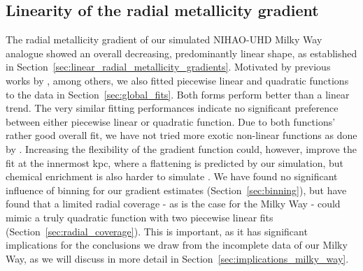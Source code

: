 \documentclass[twocolumn,apj,numberedappendix,appendixfloats]{openjournal}
\begin{document}
\begin{CJK*}{UTF8}{gbsn}
\subsection{Linearity of the radial metallicity gradient} \label{sec:discussion_linearity}

The radial metallicity gradient of our simulated NIHAO-UHD Milky Way analogue showed an overall decreasing, predominantly linear shape, as established in Section~\ref{sec:linear_radial_metallicity_gradients}. Motivated by previous works by \citet{SanchezMenguiano2016}, among others, we also fitted piecewise linear and quadratic functions to the data in Section~\ref{sec:global_fits}. Both forms perform better than a linear trend. The very similar fitting performances indicate no significant preference between either piecewise linear or quadratic function. Due to both functions' rather good overall fit, we have not tried more exotic non-linear functions as done by \citet{Scarano2013}. Increasing the flexibility of the gradient function could, however, improve the fit at the innermost kpc, where a flattening is predicted by our simulation, but chemical enrichment is also harder to simulate \citep[see also][]{Minchev2013, Sun2024}. We have found no significant influence of binning for our gradient estimates (Section~\ref{sec:binning}), but have found that a limited radial coverage - as is the case for the Milky Way - could mimic a truly quadratic function with two piecewise linear fits (Section~\ref{sec:radial_coverage}). This is important, as it has significant implications for the conclusions we draw from the incomplete data of our Milky Way, as we will discuss in more detail in Section~\ref{sec:implications_milky_way}.


\end{CJK*}
\end{document}
